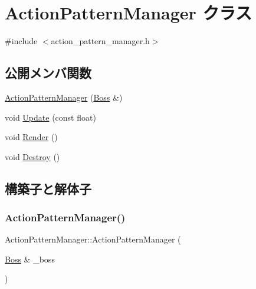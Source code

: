\hypertarget{class_action_pattern_manager}{}\section{Action\+Pattern\+Manager クラス}
\label{class_action_pattern_manager}


{\ttfamily \#include $<$action\+\_\+pattern\+\_\+manager.\+h$>$}

\subsection*{公開メンバ関数}
\begin{DoxyCompactItemize}
\item 
\mbox{\hyperlink{class_action_pattern_manager_a5bec0e724b77bbe2acb3ff62c7c8644d}{Action\+Pattern\+Manager}} (\mbox{\hyperlink{class_boss}{Boss}} \&)
\item 
void \mbox{\hyperlink{class_action_pattern_manager_a0cefb944b14e16b805b549831a8c060b}{Update}} (const float)
\item 
void \mbox{\hyperlink{class_action_pattern_manager_a094e2e5e3bbaf87e597b41b074ba2bd3}{Render}} ()
\item 
void \mbox{\hyperlink{class_action_pattern_manager_a24ae5b706adcb376c222703c55396c03}{Destroy}} ()
\end{DoxyCompactItemize}


\subsection{構築子と解体子}
\mbox{\label{class_action_pattern_manager_a5bec0e724b77bbe2acb3ff62c7c8644d}} 
\subsubsection{\texorpdfstring{Action\+Pattern\+Manager()}{ActionPatternManager()}}
{\footnotesize\ttfamily Action\+Pattern\+Manager\+::\+Action\+Pattern\+Manager (\begin{DoxyParamCaption}\item[{\mbox{\hyperlink{class_boss}{Boss}} \&}]{\+\_\+boss }\end{DoxyParamCaption})}



